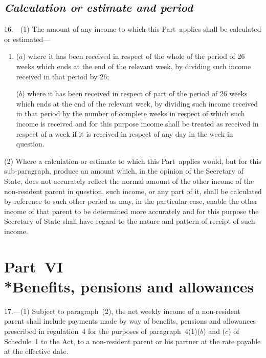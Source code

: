 \documentclass[12pt,a4paper]{article}
\begin{document}
\subsection*{\itshape Calculation or estimate and period}

16.---(1)  The amount of any income to which this Part~applies shall be calculated or estimated—
\begin{enumerate}\item[]
($a$) where it has been received in respect of the whole of the period of 26 weeks which ends at the end of the relevant week, by dividing such income received in that period by 26;

($b$) where it has been received in respect of part of the period of 26 weeks which ends at the end of the relevant week, by dividing such income received in that period by the number of complete weeks in respect of which such income is received and for this purpose income shall be treated as received in respect of a week if it is received in respect of any day in the week in question.
\end{enumerate}

(2) Where a calculation or estimate to which this Part~applies would, but for this sub-paragraph, produce an amount which, in the opinion of the Secretary of State, does not accurately reflect the normal amount of the other income of the non-resident parent in question, such income, or any part of it, shall be calculated by reference to such other period as may, in the particular case, enable the other income of that parent to be determined more accurately and for this purpose the Secretary of State shall have regard to the nature and pattern of receipt of such income. 

\section[Part~VI --- Benefits, pensions and allowances]{Part~VI\\*Benefits, pensions and allowances}

\renewcommand\parthead{--- Schedule~Part~VI}

17.---(1)  Subject to paragraph~(2), the net weekly income of a non-resident parent shall include payments made by way of benefits, pensions and allowances prescribed in regulation~4 for the purposes of paragraph~4(1)($b$)  and ($c$)  of Schedule~1 to the Act, to a non-resident parent or his partner at the rate payable at the effective date.
\end{document}
